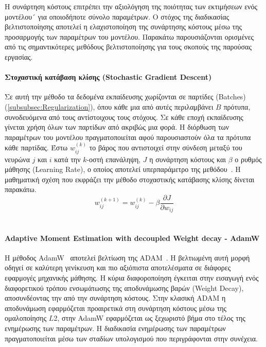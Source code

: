 \documentclass[12pt]{article}
\numberwithin{equation}{section}
\begin{document}
Η συνάρτηση κόστους επιτρέπει την αξιολόγηση της ποιότητας των εκτιμήσεων ενός μοντέλου´ για οποιοδήποτε σύνολο παραμέτρων. Ο στόχος της διαδικασίας βελτιστοποίησης αποτελεί η ελαχιστοποίηση της συνάρτησης κόστους μέσω της προσαρμογής των παραμέτρων του μοντέλου. Παρακάτω παρουσιάζονται ορισμένες από τις σημαντικότερες μεθόδους βελτιστοποίησης για τους σκοπούς της παρούσας εργασίας. \\

\paragraph{Στοχαστική κατάβαση κλίσης (Stochastic Gradient Descent)\\ [0.5 cm]}

Σε αυτή την μέθοδο τα δεδομένα εκπαίδευσης χωρίζονται σε παρτίδες (Batches) (\cref{subsubsec:Regularization}), όπου κάθε μια από αυτές περιλαμβάνει \(B\) πρότυπα, συνοδευόμενα από τους αντίστοιχους τους στόχους. Σε κάθε εποχή εκπαίδευσης γίνεται χρήση όλων των παρτίδων από ακριβώς μια φορά. Η διόρθωση των παραμέτρων του μοντέλου πραγματοποιείται αφού παρουσιαστούν όλα τα πρότυπα κάθε παρτίδας. Έστω \(w_{ij}^{(k)}\) το βάρος που αντιστοιχεί στην σύνδεση μεταξύ του νευρώνα \(j\) και \(i\) κατά την \(k\)-οστή επανάληψη, \(J\) η συνάρτηση κόστους και \(\beta\) ο ρυθμός μάθησης (Learning Rate), ο οποίος αποτελεί υπερπαράμετρο της μεθόδου~\cite{BotsisDiamantaras2019}. Η μαθηματική σχέση που εκφράζει την μέθοδο στοχαστικής κατάβασης κλίσης δίνεται παρακάτω.\\

\begin{equation}
w_{ij}^{(k+1)} = w_{ij}^{(k)} - \beta \frac{\partial J}{\partial w_{ij}}
\end{equation}\\

\paragraph{Adaptive Moment Estimation with decoupled Weight decay - AdamW\\[0.5 cm]}

Η μέθοδος AdamW~\cite{loshchilov2019decoupledweightdecayregularization} αποτελεί βελτίωση της ADAM~\cite{kingma2017adammethodstochasticoptimization}. Η βελτιωμένη αυτή μορφή οδηγεί σε καλύτερη γενίκευση και πιο αξιόπιστα αποτελέσματα σε διάφορες εφαρμογές μηχανικής μάθησης. Η κύρια διαφοροποίηση έγκειται στην εισαγωγή ενός διαφορετικού τρόπου ενσωμάτωσης της αποδυνάμωσης βαρών (Weight Decay), αποσυνδέοντας την από την συνάρτηση κόστους. Στην κλασική ADAM η αποδυνάμωση εφαρμόζεται προαιρετικά στη συνάρτηση κόστους μέσω της ομαλοποίησης \(L\)2, στην AdamW εφαρμόζεται ως ξεχωριστό βήμα στο τέλος της ενημέρωσης των παραμέτρων. Η διαδικασία ενημέρωσης των παραμέτρων πραγματοποιείται μέσω των σταδίων υπολογισμού που περιγράφονται στην συνέχεια.\\
\end{document}
